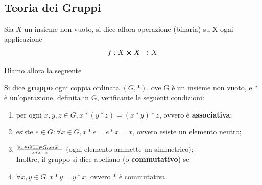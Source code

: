 \begin{flushleft}
\section{Teoria dei Gruppi}
\begin{definizione}
Sia $X$ un insieme non vuoto, si dice allora operazione (binaria) su X ogni applicazione
\[f: X \cross X \to X\]
\end{definizione}
Diamo allora la seguente
\begin{definizione}[Gruppo]
Si dice \textbf{gruppo} ogni coppia ordinata $(G, \ast)$, ove G è un insieme non vuoto, e $\ast$ è un'operazione, definita in G, verificante le seguenti condizioni:
\begin{enumerate}
    \item per ogni $x, y, z \in G, x\ast(y\ast z) = (x\ast y)\ast z$, ovvero è \textbf{associativa};
    \item esiste $e\in G:\forall x\in G, x\ast e = e \ast x = x$, ovvero esiste un elemento neutro;
    \item $\forall x\in G\exists \overline{x}\in G: x \ast \overline{x} = \over{x} \ast x = e$ (ogni elemento ammette un simmetrico);\\
    Inoltre, il gruppo si dice abeliano (o \textbf{commutativo}) se
    \item $\forall x,y \in G, x\ast y = y \ast x$, ovvero $\ast$ è commutativa.
\end{enumerate}
\end{definizione}































\end{flushleft}
